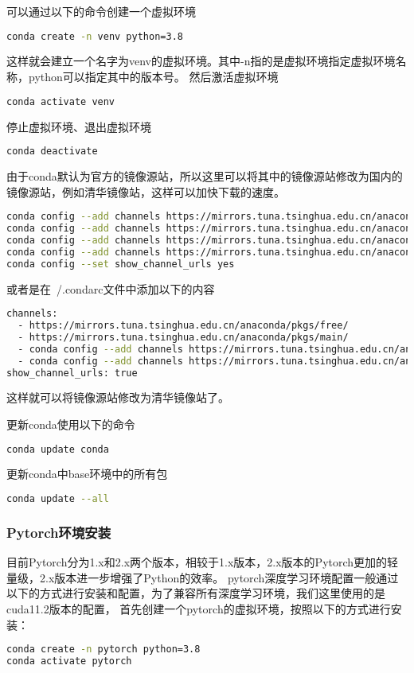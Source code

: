 \documentclass[lang=cn,a4paper,newtx]{elegantpaper}
\begin{document}
\begin{itemize}
可以通过以下的命令创建一个虚拟环境
\begin{lstlisting}[language=bash]
conda create -n venv python=3.8
\end{lstlisting}

这样就会建立一个名字为venv的虚拟环境。其中-n指的是虚拟环境指定虚拟环境名称，python可以指定其中的版本号。
然后激活虚拟环境
\begin{lstlisting}[language=bash]
conda activate venv
\end{lstlisting}

停止虚拟环境、退出虚拟环境
\begin{lstlisting}[language=bash]
conda deactivate
\end{lstlisting}

由于conda默认为官方的镜像源站，所以这里可以将其中的镜像源站修改为国内的镜像源站，例如清华镜像站，这样可以加快下载的速度。
\begin{lstlisting}[language=bash]
conda config --add channels https://mirrors.tuna.tsinghua.edu.cn/anaconda/pkgs/free/
conda config --add channels https://mirrors.tuna.tsinghua.edu.cn/anaconda/pkgs/main/
conda config --add channels https://mirrors.tuna.tsinghua.edu.cn/anaconda/cloud/conda-forge
conda config --add channels https://mirrors.tuna.tsinghua.edu.cn/anaconda/cloud/msys2/
conda config --set show_channel_urls yes
\end{lstlisting}

或者是在~/.condarc文件中添加以下的内容
\begin{lstlisting}[language=bash]
channels:
  - https://mirrors.tuna.tsinghua.edu.cn/anaconda/pkgs/free/
  - https://mirrors.tuna.tsinghua.edu.cn/anaconda/pkgs/main/
  - conda config --add channels https://mirrors.tuna.tsinghua.edu.cn/anaconda/cloud/conda-forge
  - conda config --add channels https://mirrors.tuna.tsinghua.edu.cn/anaconda/cloud/msys2/
show_channel_urls: true
\end{lstlisting}

这样就可以将镜像源站修改为清华镜像站了。

更新conda使用以下的命令
\begin{lstlisting}[language=bash]
conda update conda
\end{lstlisting}
更新conda中base环境中的所有包
\begin{lstlisting}[language=bash]
conda update --all
\end{lstlisting}

\end{itemize}
\subsubsection{Pytorch环境安装}
目前Pytorch分为1.x和2.x两个版本，相较于1.x版本，2.x版本的Pytorch更加的轻量级，2.x版本进一步增强了Python的效率。
pytorch深度学习环境配置一般通过以下的方式进行安装和配置，为了兼容所有深度学习环境，我们这里使用的是cuda11.2版本的配置，
首先创建一个pytorch的虚拟环境，按照以下的方式进行安装：
\begin{lstlisting}[language=bash]
conda create -n pytorch python=3.8
conda activate pytorch
\end{lstlisting}
\end{document}
